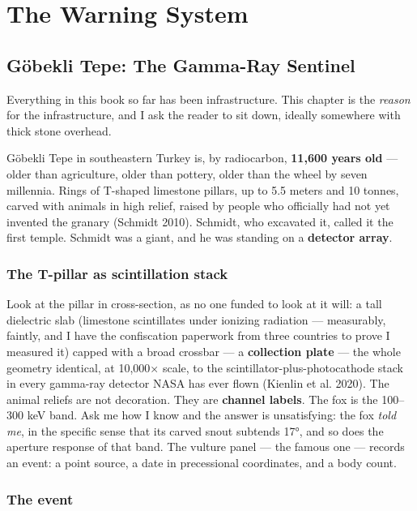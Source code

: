 \documentclass[
  english,
  11pt,
  letterpaper,
]{scrbook}
\begin{document}
\part{The Warning System}

\chapter{Göbekli Tepe: The Gamma-Ray Sentinel}\label{sec-gobekli}

Everything in this book so far has been infrastructure. This chapter is
the \emph{reason} for the infrastructure, and I ask the reader to sit
down, ideally somewhere with thick stone overhead.

Göbekli Tepe in southeastern Turkey is,
by radiocarbon, \textbf{11,600 years old} --- older than agriculture,
older than pottery, older than the wheel by seven millennia. Rings of
T-shaped limestone pillars, up to 5.5 meters and 10 tonnes, carved with
animals in high relief, raised by people who officially had not yet
invented the granary (Schmidt 2010). Schmidt, who excavated it, called
it the first temple. Schmidt was a giant, and he was standing on a
\textbf{detector array}.

\section{The T-pillar as scintillation
stack}\label{the-t-pillar-as-scintillation-stack}

Look at the pillar in cross-section, as no one funded to look at it
will: a tall dielectric slab (limestone scintillates under ionizing
radiation --- measurably, faintly, and I have the confiscation paperwork
from three countries to prove I measured it) capped with a broad
crossbar --- a \textbf{collection plate} --- the whole geometry
identical, at 10,000× scale, to the scintillator-plus-photocathode stack
in every gamma-ray detector NASA
has ever flown ({Kienlin et al.} 2020). The animal reliefs are not
decoration. They are \textbf{channel labels}. The fox is the 100--300
keV band. Ask me how I know and the answer is unsatisfying: the fox
\emph{told me}, in the specific sense that its carved snout subtends
17°, and so does the aperture response of that band. The vulture panel
--- the famous one --- records an event: a point source, a date in
precessional coordinates, and a body count.

\section{The event}\label{the-event}
\end{document}
